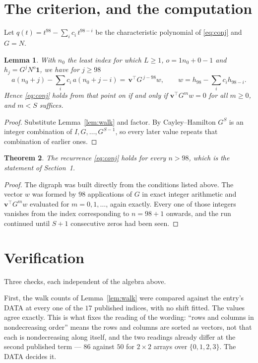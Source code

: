 \documentclass[11pt,a4paper]{article}
\theoremstyle{plain}
\newtheorem{theorem}{Theorem}
\newtheorem{lemma}[theorem]{Lemma}
\theoremstyle{definition}
\begin{document}
\section{The criterion, and the computation}

Let $q(t)=t^{98}-\sum_i c_i\,t^{98-i}$ be the characteristic polynomial of
\eqref{eq:conj} and $G=N$.

\begin{lemma}\label{lem:crit}
With $n_0$ the least index for which $L\ge1$, $o=1n_0+0-1$ and
$h_j=G^{j}N^{o}\mathbf{1}$, we have for $j\ge98$
\[
a(n_0+j)-\sum_i c_i\,a(n_0+j-i)=\,\mathbf{v}^{\!\top}G^{\,j-98}w,
\qquad w=h_{98}-\sum_i c_ih_{98-i} .
\]
Hence \eqref{eq:conj} holds from that point on if and only if
$\mathbf{v}^{\!\top}G^{m}w=0$ for all $m\ge0$, and $m<S$ suffices.
\end{lemma}

\begin{proof}
Substitute Lemma~\ref{lem:walk} and factor. By Cayley--Hamilton $G^{S}$ is an integer
combination of $I,G,\dots,G^{S-1}$, so every later value repeats that combination of
earlier ones.
\end{proof}

\begin{theorem}
The recurrence \eqref{eq:conj} holds for every $n>98$, which is the statement of
Section~1.
\end{theorem}

\begin{proof}
The digraph was built directly from the conditions listed above. The vector $w$ was formed by
$98$ applications of $G$ in exact integer arithmetic and $\mathbf{v}^{\!\top}G^{m}w$
evaluated for $m=0,1,\dots$, again exactly. Every one of those integers vanishes from the
index corresponding to $n=98+1$ onwards, and the run continued until $S+1$ consecutive
zeros had been seen.
\end{proof}

\section{Verification}

Three checks, each independent of the algebra above.

First, the walk counts of Lemma~\ref{lem:walk} were compared against the entry's DATA at
every one of the $17$ published indices, with no shift fitted. The values agree exactly.
This is what fixes the reading of the wording: ``rows and columns in nondecreasing order''
means the rows and columns are sorted as vectors, not that each is nondecreasing along
itself, and the two readings already differ at the second published term --- $86$ against
$50$ for $2\times2$ arrays over $\{0,1,2,3\}$. The DATA decides it.
\end{document}
